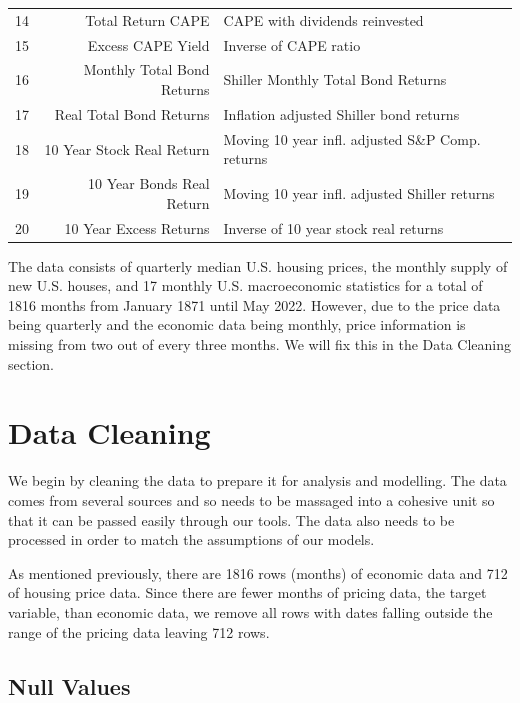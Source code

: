 \documentclass [MS] {uclathes}
\begin{document}
\begin{table}[H]
\begin{tabular}{c|r|l}
14 &            Total Return CAPE          & CAPE with dividends reinvested \\
15 &            Excess CAPE Yield          & Inverse of CAPE ratio \\
16 &            Monthly Total Bond Returns & Shiller Monthly Total Bond Returns \\
17 &            Real Total Bond Returns    & Inflation adjusted Shiller bond returns \\
18 &            10 Year Stock Real Return  & Moving 10 year infl. adjusted S\&P Comp. returns \\
19 &            10 Year Bonds Real Return  & Moving 10 year infl. adjusted Shiller returns \\
20 &            10 Year Excess Returns     & Inverse of 10 year stock real returns \\
\hline
\end{tabular}
\end{table}

The data consists of quarterly median U.S. housing prices, the monthly supply of new U.S. houses, and 17 monthly U.S. macroeconomic statistics for a total of 1816 months from January 1871 until May 2022. However, due to the price data being quarterly and the economic data being monthly, price information is missing from two out of every three months. We will fix this in the Data Cleaning section.





\section{Data Cleaning}

We begin by cleaning the data to prepare it for analysis and modelling. The data comes from several sources and so needs to be massaged into a cohesive unit so that it can be passed easily through our tools. The data also needs to be processed in order to match the assumptions of our models.

As mentioned previously, there are 1816 rows (months) of economic data and 712 of housing price data. Since there are fewer months of pricing data, the target variable, than economic data, we remove all rows with dates falling outside the range of the pricing data leaving 712 rows.

\subsection{Null Values}
\end{document}
